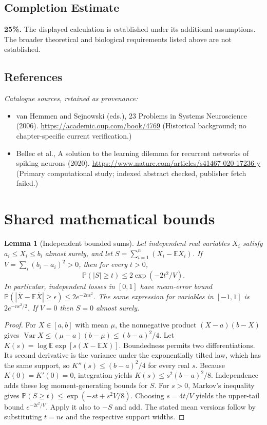 \documentclass[11pt]{article}
\newcommand{\E}{\mathbb E}
\newcommand{\Prob}{\mathbb P}
\DeclareMathOperator{\Var}{Var}
\providecommand{\E}{\mathbb E}
\providecommand{\Prob}{\mathbb P}
\providecommand{\Var}{\operatorname{Var}}
\newtheorem{sharedlemma}{Lemma}[section]
\begin{document}
\subsection{Completion Estimate}
\textbf{25\%.} The displayed calculation is established under its additional assumptions. The broader theoretical and biological requirements listed above are not established.
\subsection{References}
\noindent\emph{Catalogue sources, retained as provenance:}
\begin{itemize}
\item van Hemmen and Sejnowski (eds.), 23 Problems in Systems Neuroscience (2006). \url{https://academic.oup.com/book/4769} (Historical background; no chapter-specific current verification.)
\item Bellec et al., A solution to the learning dilemma for recurrent networks of spiking neurons (2020). \url{https://www.nature.com/articles/s41467-020-17236-y} (Primary computational study; indexed abstract checked, publisher fetch failed.)
\end{itemize}
\clearpage


\appendix
\section{Shared mathematical bounds}\label{app:bounds}
\begin{sharedlemma}[Independent bounded sums]\label{lem:bounded}
Let independent real variables $X_i$ satisfy $a_i\leq X_i\leq b_i$ almost surely,
and let $S=\sum_{i=1}^n(X_i-\E X_i)$. If
$V=\sum_i(b_i-a_i)^2>0$, then for every $t>0$,
\[
 \Prob(|S|\geq t)\leq 2\exp(-2t^2/V).
\]
In particular, independent losses in $[0,1]$ have mean-error bound
$\Prob(|\overline X-\E\overline X|\geq\epsilon)
\leq2e^{-2n\epsilon^2}$. The same expression for variables in $[-1,1]$
is $2e^{-n\epsilon^2/2}$. If $V=0$ then $S=0$ almost surely.
\end{sharedlemma}
\begin{proof}
For $X\in[a,b]$ with mean $\mu$, the nonnegative product
$(X-a)(b-X)$ gives
$\Var X\leq(\mu-a)(b-\mu)\leq(b-a)^2/4$.
Let $K(s)=\log\E\exp[s(X-\E X)]$.
Boundedness permits two differentiations. Its second derivative is the variance
under the exponentially tilted law, which has the same support, so
$K''(s)\leq(b-a)^2/4$ for every real $s$.
Because $K(0)=K'(0)=0$, integration yields
$K(s)\leq s^2(b-a)^2/8$.
Independence adds these log moment-generating bounds for $S$.
For $s>0$, Markov's inequality gives
$\Prob(S\geq t)\leq\exp(-st+s^2V/8)$.
Choosing $s=4t/V$ yields the upper-tail bound $e^{-2t^2/V}$.
Apply it also to $-S$ and add. The stated mean versions follow by substituting
$t=n\epsilon$ and the respective support widths.
\end{proof}
\end{document}

